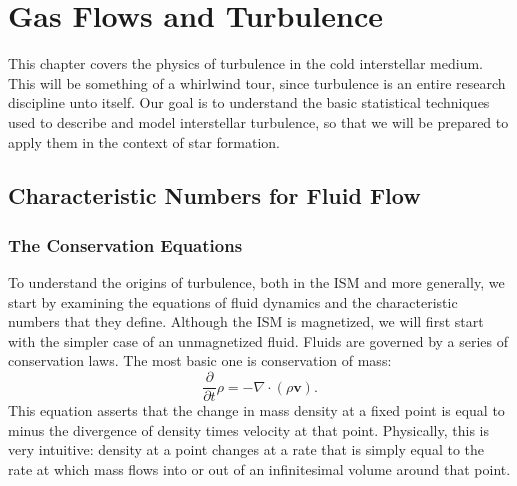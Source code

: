 \chapter{Gas Flows and Turbulence}
\label{ch:turbulence}

This chapter covers the physics of turbulence in the cold interstellar medium. This will be something of a whirlwind tour, since turbulence is an entire research discipline unto itself. Our goal is to understand the basic statistical techniques used to describe and model interstellar turbulence, so that we will be prepared to apply them in the context of star formation.

\section{Characteristic Numbers for Fluid Flow}

\subsection{The Conservation Equations}

To understand the origins of turbulence, both in the ISM and more generally, we start by examining the equations of fluid dynamics and the characteristic numbers that they define. Although the ISM is magnetized, we will first start with the simpler case of an unmagnetized fluid. Fluids are governed by a series of conservation laws. The most basic one is conservation of mass:
\begin{equation}
\frac{\partial}{\partial t} \rho = -\nabla \cdot (\rho\mathbf{v}).
\end{equation}
This equation asserts that the change in mass density at a fixed point is equal to minus the divergence of density times velocity at that point. Physically, this is very intuitive: density at a point changes at a rate that is simply equal to the rate at which mass flows into or out of an infinitesimal volume around that point.

